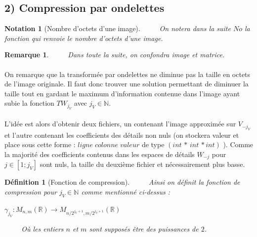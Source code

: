 \documentclass[a4paper,10pt]{report}
\theoremstyle{break}
\newtheorem{Def}{D\'{e}finition}
\newtheorem{Rem}{Remarque}
\newtheorem{Nota}{Notation}
\begin{document}
  \subsection*{2) Compression par ondelettes}
  
    \begin{Nota}[Nombre d'octets d'une image]
      $\phantom{Prop}$ On notera dans la suite $No$ la fonction qui renvoie le nombre d'octets d'une image.
    \end{Nota}

    \begin{Rem}
      $\phantom{Prop}$ Dans toute la suite, on confondra image et matrice.
    \end{Rem}
  
    \paragraph{} On remarque que la transform\'{e}e par ondelettes ne diminue pas la taille en octets de l'image originale.
      Il faut donc trouver une solution permettant de diminuer la taille tout en gardant le maximum d'information contenue 
      dans l'image ayant subie la fonction $TW_{j_V}$ avec $j_V \in \mathbb{N}$.
      
    \paragraph{} L'id\'{e}e est alors d'obtenir deux fichiers, un contenant l'image approxim\'{e}e sur $V_{-j_V}$ et l'autre contenant
      les coefficients des d\'{e}tails non nuls (on stockera valeur et place sous cette forme : $ligne \; colonne \; valeur$
      de type $(int \, * \, int \, * int)$ ). 
      Comme la majorit\'{e} des coefficients contenus dans les espaces de d\'{e}tails $W_{-j}$
      pour $j \in [1;j_V]$ sont nuls, la taille du deuxi\`{e}me fichier et n\'{e}cessairement plus basse.
      
    \begin{Def}[Fonction de compression]
      $\phantom{Prop}$ Ainsi on d\'{e}finit la fonction de compression pour $j_V \in \mathbb{N}$ comme mentionn\'{e} ci-dessus :
      \begin{center}
	$ \gamma_{j_V} : M_{n, m}(\mathbb{R}) \longrightarrow M_{n / 2^{j_V + 1}, m / 2^{j_V + 1}}(\mathbb{R}) $
      \end{center}
      $\phantom{Prop}$ O\`{u} les entiers $n$ et $m$ sont suppos\'{e}s \^{e}tre des puissances de $2$.
    \end{Def}
    
\end{document}
